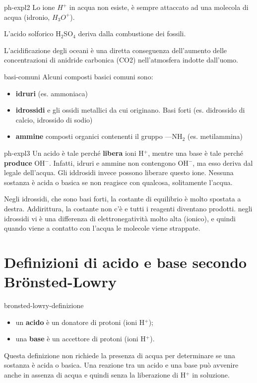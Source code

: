 \documentclass[preview]{standalone}
\begin{document}
\begin{snippet}{ph-expl2}
    Lo ione \(H^+\) in acqua non esiste, è sempre attaccato ad una molecola di acqua (idronio, \(H_3O^+\)).

    L'acido solforico H\({}_2\)SO\({}_4\) deriva dalla combustione dei fossili.

    L'acidificazione degli oceani è una diretta conseguenza dell'aumento delle concentrazioni di anidride carbonica (CO2) nell'atmosfera indotte dall'uomo.
\end{snippet}

\begin{snippet}{basi-comuni}
    Alcuni composti basici comuni sono:
    \begin{itemize}
        \item \textbf{idruri} (es. ammoniaca)
        \item \textbf{idrossidi} e gli ossidi metallici da cui originano. Basi forti (es. didrossido di calcio, idrossido di sodio)
        \item \textbf{ammine} composti organici contenenti il gruppo —NH\({}_2\) (es. metilammina)
    \end{itemize}
\end{snippet}

\begin{snippet}{ph-expl3}
    Un acido è tale perché \textbf{libera} ioni H\({}^+\),
    mentre una base è tale perché \textbf{produce} OH\({}^-\).
    Infatti, idruri e ammine non contengono OH\({}^-\), ma esso deriva dal legale dell'acqua.
    Gli iddrosidi invece possono liberare questo ione.
    Nessuna sostanza è acida o basica se non reagisce con qualcosa, solitamente l'acqua.

    Negli idrossidi, che sono basi forti, la costante di equilibrio è molto spostata a destra.
    Addirittura, la costante non c'è e tutti i reagenti diventano prodotti.
    negli idrossidi vi è una differenza di elettronegatività molto alta (ionico),
    e quindi quando viene a contatto con l'acqua le molecole viene strappate.
\end{snippet}

\section{Definizioni di acido e base secondo Brönsted-Lowry}

\begin{snippet}{bronsted-lowry-definizione}
    \begin{itemize}
        \item un \textbf{acido} è un donatore di protoni (ioni H\({}^+\));
        \item una \textbf{base} è un accettore di protoni (ioni H\({}^+\)).
    \end{itemize}
    Questa definizione non richiede la presenza di acqua per determinare se una sostanza
    è acida o basica.
    Una reazione tra un acido e una base può avvenire anche
    in assenza di acqua e quindi senza la liberazione di H\({}^+\) in
    soluzione.
\end{snippet}
\end{document}
